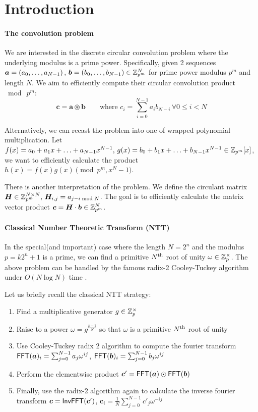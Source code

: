 \section{Introduction}
\paragraph{The convolution problem}
We are interested in the discrete circular convolution problem where the underlying modulus is a prime power. Specifically, given 2 sequences \(\bm{a} = \left({a}_0, \ldots, {a}_{N - 1}\right) ,\, \bm{b} = \left({b}_0, \ldots, {b}_{N - 1}\right) \in \mathbb{Z}_{p^m}^N\) for prime power modulus \(p^m\) and length \(N\). We aim to efficiently compute their circular convolution product \(\bmod \  p^m\):
\[\bm{c} = \bm{a} \circledast \bm{b} \qquad \text{where } c_i = \sum_{i=0}^{N-1}a_i b_{N-i} \, \forall 0 \le i < N\]

\ifFullVersion
Alternatively, we can recast the problem into one of wrapped polynomial multiplication. Let \(f(x) = a_0 + a_1 x + \ldots + a_{N-1}x^{N-1},\, g(x) = b_0 + b_1 x + \ldots + b_{N-1}x^{N-1} \in \mathbb{Z}_{p^m}[x]\), we want to efficiently calculate the product \(h(x) = f(x)g(x) \pmod{p^m, x^N - 1}\).

There is another interpretation of the problem. We define the circulant matrix \(\bm{H} \in \mathbb{Z}_{p^m}^{N \times N},\, \bm{H}_{i,j} = a_{j - i \bmod N}\). The goal is to efficiently calculate the matrix vector product \(\bm{c} = \bm{H} \cdot \bm{b} \in \mathbb{Z}_{p^m}^N\).
\fi

\paragraph{Classical Number Theoretic Transform (NTT)}
In the special(and important) case where the length \(N = 2^n\) and the modulus \(p = k2^n + 1\) is a prime, we can find a primitive \(N\textsuperscript{th}\) root of unity \(\omega \in \mathbb{Z}_p^{\times}\). The above problem can be handled by the famous radix-2 Cooley-Tuckey algorithm under \(O(N \log N)\) time . 

\ifFullVersion
Let us briefly recall the classical NTT strategy:
\begin{enumerate}
    \item Find a multiplicative generator \(g \in \mathbb{Z}_p^{\times}\)
    \item Raise to a power \(\omega = g^{\frac{p-1}{N}}\) so that \(\omega\) is a primitive \(N\textsuperscript{th}\) root of unity
    \item Use Cooley-Tuckey radix 2 algorithm to compute the fourier transform \(\mathsf{FFT}(\bm{a})_i = \sum_{j=0}^{N-1}a_j \omega^{ij}\), \(\mathsf{FFT}(\bm{b})_i = \sum_{j=0}^{N-1}b_j \omega^{ij}\)
    \item Perform the elementwise product \(\bm{c}' = \mathsf{FFT}(\bm{a}) \odot \mathsf{FFT}(\bm{b})\)
    \item Finally, use the radix-2 algorithm again to calculate the inverse fourier transform \(\bm{c} = \mathsf{InvFFT}(\bm{c}')\), \(\bm{c}_i = \frac{1}{N}\sum_{j=0}^{N-1}c'_j \omega^{-ij}\)
\end{enumerate}
\fi

